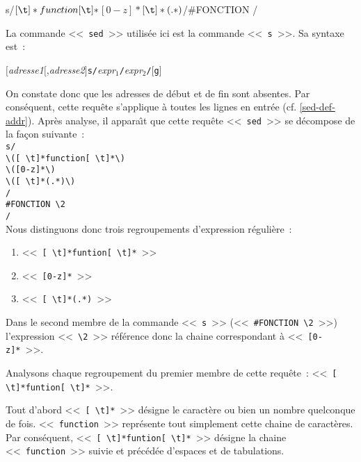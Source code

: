 \begin{example}
\begin{verbatim*}
s/\([ \t]*function[ \t]*\)\([0-z]*\)\([ \t]*(.*)\)/#FONCTION \2/
\end{verbatim*}

La commande <<~{\tt sed}~>> utilis{\'e}e ici est la commande <<~{\tt s}~>>. Sa
syntaxe est~:
\begin{center}
$[${\sl adresse1}$[$,{\sl adresse2}$]${\tt s/}{\it expr$_1$}{\tt /}{\it expr$_2$}{\tt /}$[${\tt g}$]$
\end{center}

On constate donc que les adresses de d{\'e}but et de fin sont absentes. Par cons{\'e}quent, cette requ{\^e}te s'applique {\`a} toutes les lignes en entr{\'e}e (cf. \ref{sed-def-addr}). Apr{\`e}s analyse, il appara{\^\i}t que cette requ{\^e}te <<~{\tt sed}~>> se d{\'e}compose de la fa\c{c}on suivante~:\\[1ex]
{\tt s/}\\
\hspace{0.5cm}\verb*=\([ \t]*function[ \t]*\)=\\
\hspace{0.5cm}\verb*=\([0-z]*\)=\\
\hspace{0.5cm}\verb*=\([ \t]*(.*)\)=\\
{\tt /}\\
\hspace{0.5cm}\verb*=#FONCTION \2=\\
{\tt /}\\[1ex]
Nous distinguons donc trois regroupements d'expression r{\'e}guli{\`e}re~:
\begin{enumerate}
	\item	<<~\verb*=[ \t]*funtion[ \t]*=~>>
	\item	<<~\verb=[0-z]*=~>>
	\item	<<~\verb*=[ \t]*(.*)=~>>
\end{enumerate}
Dans le second membre de la commande <<~{\tt s}~>> (<<~\verb=#FONCTION \2=~>>)
l'expression <<~\verb=\2=~>> r{\'e}f{\'e}rence donc la chaine correspondant {\`a}
<<~\verb=[0-z]*=~>>.

Analysons chaque regroupement du premier membre de cette requ{\^e}te~:
<<~\verb*=[ \t]*funtion[ \t]*=~>>.

Tout d'abord <<~\verb*=[ \t]*=~>> d{\'e}signe le caract{\`e}re \spacekey ou bien \tabkey un nombre quelconque de fois. <<~{\tt function}~>> repr{\'e}sente tout simplement cette chaine de caract{\`e}res. Par cons{\'e}quent, <<~\verb*=[ \t]*funtion[ \t]*=~>> d{\'e}signe la chaine <<~{\tt function}~>> suivie et pr{\'e}c{\'e}d{\'e}e d'espaces et de tabulations.


\end{example}
